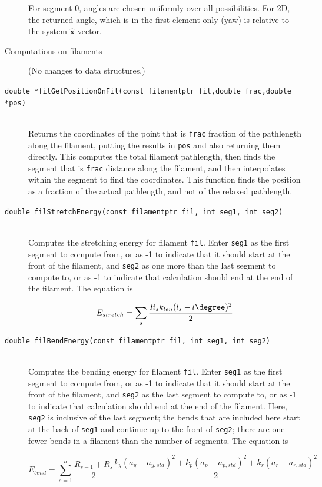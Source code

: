 \documentclass {scrbook}
\newcommand {\ttt} {\texttt}
\begin{document}
\begin{description}
For segment 0, angles are chosen uniformly over all possibilities. For 2D, the returned angle, which is in the first element only (yaw) is relative to the system $\hat{\bm{x}}$ vector.

\item[\underline{Computations on filaments}]
(No changes to data structures.)

\item[\ttt{double *filGetPositionOnFil(const filamentptr fil,double frac,double *pos)}]
\hfill \\
Returns the coordinates of the point that is \ttt{frac} fraction of the pathlength along the filament, putting the results in \ttt{pos} and also returning them directly. This computes the total filament pathlength, then finds the segment that is \ttt{frac} distance along the filament, and then interpolates within the segment to find the coordinates. This function finds the position as a fraction of the actual pathlength, and not of the relaxed pathlength.

\item[\ttt{double filStretchEnergy(const filamentptr fil, int seg1, int seg2)}]
\hfill \\
Computes the stretching energy for filament \ttt{fil}. Enter \ttt{seg1} as the first segment to compute from, or as -1 to indicate that it should start at the front of the filament, and \ttt{seg2} as one more than the last segment to compute to, or as -1 to indicate that calculation should end at the end of the filament. The equation is

$$E_{stretch} = \sum_{s} \frac{R_s k_{len} (l_s - l\degree)^2}{2}$$

\item[\ttt{double filBendEnergy(const filamentptr fil, int seg1, int seg2)}]
\hfill \\
Computes the bending energy for filament \ttt{fil}. Enter \ttt{seg1} as the first segment to compute from, or as -1 to indicate that it should start at the front of the filament, and \ttt{seg2} as the last segment to compute to, or as -1 to indicate that calculation should end at the end of the filament. Here, \ttt{seg2} is inclusive of the last segment; the bends that are included here start at the back of \ttt{seg1} and continue up to the front of \ttt{seg2}; there are one fewer bends in a filament than the number of segments. The equation is

$$E_{bend}=\sum_{s=1}^{n} \frac{R_{s-1}+R_s}{2} \frac{k_y(a_y-a_{y, std})^2+k_p(a_p-a_{p, std})^2+k_r(a_r-a_{r, std})^2}{2}$$


\end{description}
\end{document}
